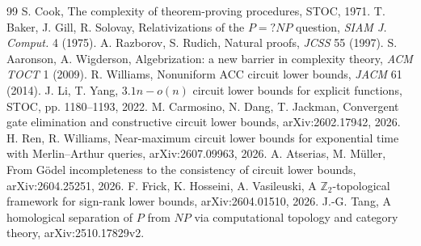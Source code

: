 \documentclass[11pt]{article}
\theoremstyle{definition}
\begin{document}
\begin{thebibliography}{99}
 S. Cook, The complexity of theorem-proving procedures, STOC, 1971.
 T. Baker, J. Gill, R. Solovay, Relativizations of the \(P=?NP\) question, \emph{SIAM J. Comput.} 4 (1975).
 A. Razborov, S. Rudich, Natural proofs, \emph{JCSS} 55 (1997).
 S. Aaronson, A. Wigderson, Algebrization: a new barrier in complexity theory, \emph{ACM TOCT} 1 (2009).
 R. Williams, Nonuniform ACC circuit lower bounds, \emph{JACM} 61 (2014).
 J. Li, T. Yang, \(3.1n-o(n)\) circuit lower bounds for explicit functions, STOC, pp. 1180--1193, 2022.
 M. Carmosino, N. Dang, T. Jackman, Convergent gate elimination and constructive circuit lower bounds, arXiv:2602.17942, 2026.
 H. Ren, R. Williams, Near-maximum circuit lower bounds for exponential time with Merlin--Arthur queries, arXiv:2607.09963, 2026.
 A. Atserias, M. M\"uller, From G\"odel incompleteness to the consistency of circuit lower bounds, arXiv:2604.25251, 2026.
 F. Frick, K. Hosseini, A. Vasileuski, A \(\mathbb Z_2\)-topological framework for sign-rank lower bounds, arXiv:2604.01510, 2026.
 J.-G. Tang, A homological separation of \(P\) from \(NP\) via computational topology and category theory, arXiv:2510.17829v2.
\end{thebibliography}
\end{document}
